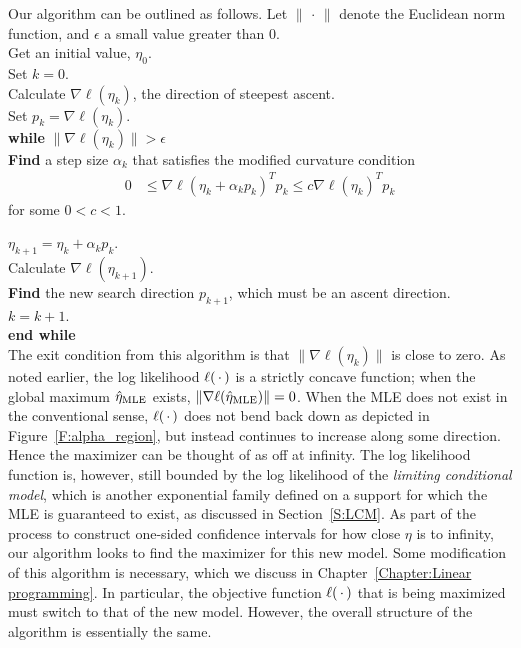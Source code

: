 Our algorithm can be outlined as follows.  Let $\lVert \, \cdot \, \rVert$ denote the 
Euclidean norm function, and $\epsilon$ 
a small value greater than 0.  \\

\noindent Get an initial value, $\eta_0$.\\ 
Set $k=0$. \\
Calculate $\nabla \ell( \eta_k)$, the direction of steepest ascent. \\
Set $p_k = \nabla \ell( \eta_k)$. \\
\textbf{while}  $\lVert \nabla \ell( \eta_k) \rVert > \epsilon$ \\ 
\hspace{4mm} \indent	 \textbf{Find} a step size $\alpha_k$ that satisfies the modified 
curvature condition
\begin{align*}
	 0 & \leq \nabla \ell( \eta_k + \alpha_k p_k)^T p_k \leq c \nabla \ell(\eta_k)^T 
p_k
\end{align*}
\indent for some $0 < c < 1$.  


$\eta_{k+1} = \eta_k + \alpha_k p_k$.\\
\indent Calculate $\nabla \ell( \eta_{k+1})$.\\
\indent \textbf{Find} the new search direction $p_{k+1}$, which must be an ascent 
direction. \\
\indent $k = k + 1$.  \\
\textbf{end while}\\

The exit condition from this algorithm is that $\lVert \nabla \ell( \eta_k) \rVert$
is close to zero.  As noted earlier, the log likelihood $\ell(\,\cdot\,)$ is a strictly
concave function; when the global maximum $\hat{\eta}_{\textrm{MLE}}$ exists, $\lVert \nabla \ell( \hat{\eta}_{\textrm{MLE}}) \rVert = 0$.  
When the MLE does not exist in the conventional sense, $\ell(\,\cdot\,)$ does not bend
 back down as depicted in Figure~\ref{F:alpha_region}, but instead continues to increase along some direction.  Hence the maximizer can be thought of as off at infinity.
The log likelihood function is, however, still bounded by 
the log likelihood of 
the \emph{limiting conditional model}, which 
is another exponential family defined on a support for which the MLE is
guaranteed to exist, as discussed in Section~\ref{S:LCM}.
As part of the process to construct one-sided confidence intervals 
for how close $\eta$ is to infinity, 
our algorithm looks to find the maximizer for this new model.  
Some modification of this algorithm is necessary, which we discuss in 
Chapter~\ref{Chapter:Linear programming}.  In particular, the objective function
$\ell( \,\cdot\,)$ that is being maximized must switch to that of the new model.
However, the overall structure of the algorithm is essentially the same.

